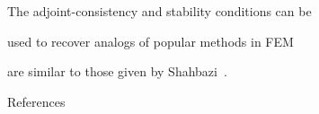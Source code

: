 \documentclass[final]{beamer}
\newlength{\secondcolwid}
\newcommand{\fnc}[1]{\ensuremath{\mathcal{#1}}}
\newcommand{\mat}[1]{\ensuremath{\mathsf{#1}}}
\renewcommand{\H}[0]{\mat{H}}
\newcommand{\Hk}[0]{\H_{\kappa}}
\newcommand{\Bg}[0]{\mat{B}_{\gamma}}
\newcommand{\Sig}[0]{\mat{\Sigma}}
\newcommand{\Rgk}[0]{\mat{R}_{\gamma\kappa}}
\newcommand{\Rgn}[0]{\mat{R}_{\gamma\nu}}
\newcommand{\Siggk}[1]{\Sig_{\gamma\kappa}^{(#1)}}
\newcommand{\Siggn}[1]{\Sig_{\gamma\nu}   ^{(#1)}}
\newcommand{\Siggam}[1]{\Sig_{\gamma}^{(#1)}}
\begin{document}
\begin{frame}[t]
\begin{columns}[t]
\begin{column}{\secondcolwid}
\begin{alertblock}{The adjoint-consistency and stability conditions can be
        
        used to recover analogs of popular methods in FEM}
\begin{itemize}
        are similar to those given by Shahbazi~\cite{Shahbazi2005explicit}. 
    \end{itemize}
%        
%        
    
\end{alertblock}

%

\begin{block}{References}
    

\end{block}
\end{column}
\end{columns}
\end{frame}
\end{document}

